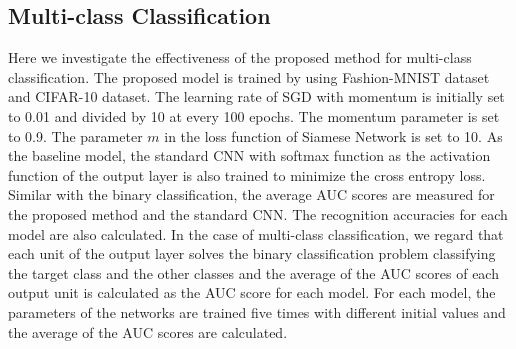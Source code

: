 \documentclass[runningheads,a4paper]{llncs}
\begin{document}
\subsection{Multi-class Classification}
Here we investigate the effectiveness of the proposed method for multi-class classification.
The proposed model is trained by using Fashion-MNIST dataset and CIFAR-10 dataset.
The learning rate of SGD with momentum is initially set to 0.01 and divided by 10 at every 100 epochs.  
The  momentum parameter is set to  0.9. 
The parameter $m$ in the loss function of Siamese Network is set to 10.
As the baseline model, the standard CNN with softmax function as the activation function of the output layer is also trained to minimize the cross entropy loss.
Similar with the binary classification, the average AUC scores are measured for the proposed method and the standard CNN.
The recognition accuracies for each model are also calculated.
In the case of multi-class classification, %
we regard that each unit of the output layer solves the binary classification problem classifying the target class and the other classes and the average of the AUC scores of each output unit is calculated as the AUC score for each model.
For each model, the parameters of the networks are trained five times with different initial values and the average of the AUC scores are calculated.
\end{document}
